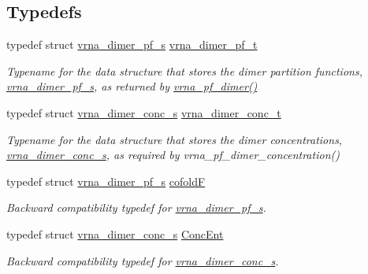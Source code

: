 \subsection*{Typedefs}
\begin{DoxyCompactItemize}
\item 
\mbox{\label{group__pf__cofold_ga444df1587c9a2ca15b8eb25188f629c3}} 
typedef struct \hyperlink{group__pf__cofold_structvrna__dimer__pf__s}{vrna\+\_\+dimer\+\_\+pf\+\_\+s} \hyperlink{group__pf__cofold_ga444df1587c9a2ca15b8eb25188f629c3}{vrna\+\_\+dimer\+\_\+pf\+\_\+t}
\begin{DoxyCompactList}\small\item\em Typename for the data structure that stores the dimer partition functions, \hyperlink{group__pf__cofold_structvrna__dimer__pf__s}{vrna\+\_\+dimer\+\_\+pf\+\_\+s}, as returned by \hyperlink{group__pf__cofold_ga4e5c7d06c302a7c59fc0d64dc142ca63}{vrna\+\_\+pf\+\_\+dimer()} \end{DoxyCompactList}\item 
\mbox{\label{group__pf__cofold_gac48c2723444ecfdceafcfd525ca98322}} 
typedef struct \hyperlink{group__pf__cofold_structvrna__dimer__conc__s}{vrna\+\_\+dimer\+\_\+conc\+\_\+s} \hyperlink{group__pf__cofold_gac48c2723444ecfdceafcfd525ca98322}{vrna\+\_\+dimer\+\_\+conc\+\_\+t}
\begin{DoxyCompactList}\small\item\em Typename for the data structure that stores the dimer concentrations, \hyperlink{group__pf__cofold_structvrna__dimer__conc__s}{vrna\+\_\+dimer\+\_\+conc\+\_\+s}, as required by vrna\+\_\+pf\+\_\+dimer\+\_\+concentration() \end{DoxyCompactList}\item 
\mbox{\label{group__pf__cofold_ga5445d8d96a40e9e79b1fa5a7f1a6b7ea}} 
typedef struct \hyperlink{group__pf__cofold_structvrna__dimer__pf__s}{vrna\+\_\+dimer\+\_\+pf\+\_\+s} \hyperlink{group__pf__cofold_ga5445d8d96a40e9e79b1fa5a7f1a6b7ea}{cofoldF}
\begin{DoxyCompactList}\small\item\em Backward compatibility typedef for \hyperlink{group__pf__cofold_structvrna__dimer__pf__s}{vrna\+\_\+dimer\+\_\+pf\+\_\+s}. \end{DoxyCompactList}\item 
\mbox{\label{group__pf__cofold_ga46244c7adf5040580291c45b465f4efa}} 
typedef struct \hyperlink{group__pf__cofold_structvrna__dimer__conc__s}{vrna\+\_\+dimer\+\_\+conc\+\_\+s} \hyperlink{group__pf__cofold_ga46244c7adf5040580291c45b465f4efa}{Conc\+Ent}
\begin{DoxyCompactList}\small\item\em Backward compatibility typedef for \hyperlink{group__pf__cofold_structvrna__dimer__conc__s}{vrna\+\_\+dimer\+\_\+conc\+\_\+s}. \end{DoxyCompactList}\end{DoxyCompactItemize}
